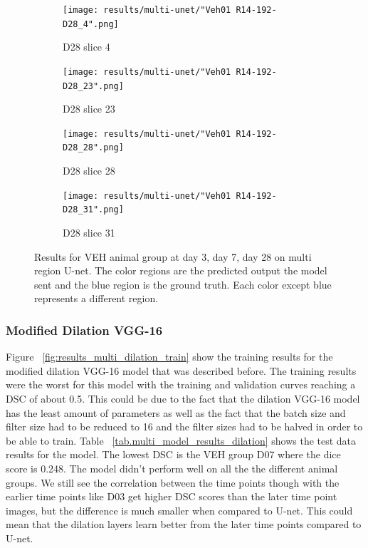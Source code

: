 \begin{figure}[!htb]
\medskip
\begin{subfigure}{0.25\textwidth}
  \texttt{[image: results/multi-unet/"Veh01 R14-192-D28\_4".png]}
  \caption{D28 slice 4}
\end{subfigure}\hfil %
\begin{subfigure}{0.25\textwidth}
  \texttt{[image: results/multi-unet/"Veh01 R14-192-D28\_23".png]}
  \caption{D28 slice 23}
\end{subfigure}\hfil %
\begin{subfigure}{0.25\textwidth}
  \texttt{[image: results/multi-unet/"Veh01 R14-192-D28\_28".png]}
  \caption{D28 slice 28}
\end{subfigure}\hfil %
\begin{subfigure}{0.25\textwidth}
  \texttt{[image: results/multi-unet/"Veh01 R14-192-D28\_31".png]}
  \caption{D28 slice 31}
\end{subfigure}
  
  \caption{Results for VEH animal group at day 3, day 7, day 28 on multi region U-net. The color regions are the predicted output the model sent and the blue region is the ground truth. Each color except blue represents a different region.}
  \label{fig:results_multi_unet_VEH}
\end{figure}


\subsubsection{Modified Dilation VGG-16}
    Figure ~\ref{fig:results_multi_dilation_train} show the training results for the modified dilation VGG-16 model that was described before. 
    The training results were the worst for this model with the training and validation curves reaching a DSC of about 0.5.
    This could be due to the fact that the dilation VGG-16 model has the least amount of parameters as well as the fact that the batch size and filter size had to be reduced to 16 and the filter sizes had to be halved in order to be able to train. 
    Table ~\ref{tab.multi_model_results_dilation} shows the test data results for the model. The lowest DSC is the VEH group D07 where the dice score is 0.248. 
    The model didn't perform well on all the the different animal groups.
    We still see the correlation between the time points though with the earlier time points like D03 get higher DSC scores than the later time point images, but the difference is much smaller when compared to U-net. 
    This could mean that the dilation layers learn better from the later time points compared to U-net.
    
